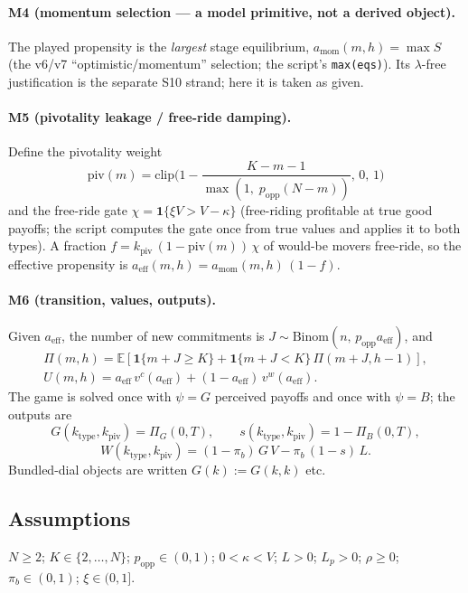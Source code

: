 \paragraph{M4 (momentum selection --- a model primitive, not a derived object).}
The played propensity is the \emph{largest} stage equilibrium,
$a_{\mathrm{mom}}(m,h)=\max S$ (the v6/v7 ``optimistic/momentum'' selection; the script's
\texttt{max(eqs)}). Its $\lambda$-free justification is the separate S10 strand; here it is
taken as given.

\paragraph{M5 (pivotality leakage / free-ride damping).}
Define the pivotality weight
\[
\mathrm{piv}(m)=\mathrm{clip}\Big(1-\frac{K-m-1}{\max(1,\;p_{\mathrm{opp}}(N-m))},\,0,\,1\Big)
\]
and the free-ride gate $\chi=\mathbf 1\{\xi V>V-\kappa\}$ (free-riding profitable at true good
payoffs; the script computes the gate once from true values and applies it to both types). A
fraction $f=k_{\mathrm{piv}}\,(1-\mathrm{piv}(m))\,\chi$ of would-be movers free-ride, so the
effective propensity is $a_{\mathrm{eff}}(m,h)=a_{\mathrm{mom}}(m,h)\,(1-f)$.

\paragraph{M6 (transition, values, outputs).}
Given $a_{\mathrm{eff}}$, the number of new commitments is
$J\sim\mathrm{Binom}(n,\,p_{\mathrm{opp}}a_{\mathrm{eff}})$, and
\begin{gather*}
\Pi(m,h)=\mathbb E[\mathbf 1\{m+J\ge K\}+\mathbf 1\{m+J<K\}\,\Pi(m+J,h-1)],\\
U(m,h)=a_{\mathrm{eff}}\,v^c(a_{\mathrm{eff}})+(1-a_{\mathrm{eff}})\,v^w(a_{\mathrm{eff}}).
\end{gather*}
The game is solved once with $\psi=G$ perceived payoffs and once with $\psi=B$; the outputs are
\[
G(k_{\mathrm{type}},k_{\mathrm{piv}})=\Pi_G(0,T),\qquad
s(k_{\mathrm{type}},k_{\mathrm{piv}})=1-\Pi_B(0,T),
\]
\[
W(k_{\mathrm{type}},k_{\mathrm{piv}})=(1-\pi_b)\,G\,V-\pi_b\,(1-s)\,L .
\]
Bundled-dial objects are written $G(k):=G(k,k)$ etc.

\subsection*{Assumptions}

\begin{assumption}[A0 --- regularity]\label{ass:A0}
$N\ge 2$; $K\in\{2,\dots,N\}$; $p_{\mathrm{opp}}\in(0,1)$; $0<\kappa<V$; $L>0$; $L_p>0$;
$\rho\ge 0$; $\pi_b\in(0,1)$; $\xi\in(0,1]$.
\end{assumption}

